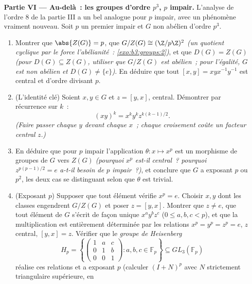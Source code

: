 \begin{problem}
\medskip
\noindent\textbf{Partie VI --- Au-delà~: les groupes d'ordre
$p^3$, $p$ impair.} L'analyse de l'ordre $8$ de la partie III a
un bel analogue pour $p$ impair, avec un phénomène vraiment
nouveau. Soit $p$ un premier impair et $G$ non abélien d'ordre
$p^3$.
\begin{enumerate}[resume]
  \item Montrer que $\abs{Z(G)} = p$, que $G/Z(G) \cong
        (\Z/p\Z)^2$ \emph{(un quotient cyclique par le 
        force l'abélianité~: \cref{exo:b3:groups:2})}, et que
        $D(G) = Z(G)$ \emph{(pour $D(G) \subseteq Z(G)$, utiliser
        que $G/Z(G)$ est abélien~; pour l'égalité, $G$ est non
        abélien et $D(G) \neq \{e\}$)}. En déduire que tout
         $[x, y] = xyx^{-1}y^{-1}$ est central et
        d'ordre divisant $p$.
  \item (L'identité clé) Soient $x, y \in G$ et $z = [y, x]$,
        central. Démontrer par récurrence sur $k$~:
        \[
        (xy)^k = x^k y^k z^{k(k-1)/2} .
        \]
        \emph{(Faire passer chaque $y$ devant chaque $x$~; chaque
        croisement coûte un facteur central $z$.)}
  \item En déduire que pour $p$ impair l'application $\theta
        \colon x \mapsto x^p$ est un morphisme de groupes de $G$
        vers $Z(G)$ \emph{(pourquoi $x^p$ est-il central~?
        pourquoi $z^{p(p-1)/2} = e$ a-t-il besoin de $p$
        impair~?)}, et conclure que $G$ a exposant $p$ ou $p^2$,
        les deux cas se distinguant selon que $\theta$ est
        trivial.
  \item (Exposant $p$) Supposer que tout élément vérifie $x^p =
        e$. Choisir $x, y$ dont les classes engendrent $G/Z(G)$ et
        poser $z = [y, x]$. Montrer que $z \neq e$, que tout
        élément de $G$ s'écrit de façon unique $x^ay^bz^c$ ($0
        \leq a, b, c < p$), et que la multiplication est
        entièrement déterminée par les relations $x^p = y^p =
        z^p = e$, $z$ central, $[y, x] = z$. Vérifier que le
        \emph{groupe de Heisenberg}
        \[
        H_p = \left\{
        \begin{pmatrix} 1 & a & c\\ 0 & 1 & b\\ 0 & 0 & 1
        \end{pmatrix} : a, b, c \in \mathbb F_p \right\}
        \subseteq GL_3(\mathbb F_p)
        \]
        réalise ces relations et a exposant $p$ (calculer $(I +
        N)^p$ avec $N$ strictement triangulaire supérieure, en

\end{enumerate}
\end{problem}
